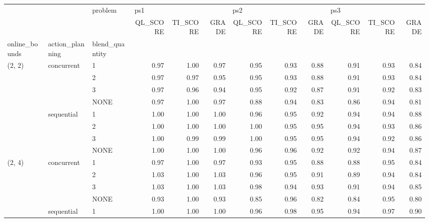 \begin{tabular}{lllrrrrrrrrr}
\toprule
       &            & problem & \multicolumn{3}{l}{ps1} & \multicolumn{3}{l}{ps2} & \multicolumn{3}{l}{ps3} \\
       &            & {} & QL\_SCORE & TI\_SCORE & GRADE & QL\_SCORE & TI\_SCORE & GRADE & QL\_SCORE & TI\_SCORE & GRADE \\
online\_bounds & action\_planning & blend\_quantity &          &          &       &          &          &       &          &          &       \\
\midrule
(2, 2) & concurrent & 1 &     0.97 &     1.00 &  0.97 &     0.95 &     0.93 &  0.88 &     0.91 &     0.93 &  0.84 \\
       &            & 2 &     0.97 &     0.97 &  0.95 &     0.95 &     0.93 &  0.88 &     0.91 &     0.93 &  0.84 \\
       &            & 3 &     0.97 &     0.96 &  0.94 &     0.95 &     0.92 &  0.87 &     0.91 &     0.92 &  0.83 \\
       &            & NONE &     0.97 &     1.00 &  0.97 &     0.88 &     0.94 &  0.83 &     0.86 &     0.94 &  0.81 \\
       & sequential & 1 &     1.00 &     1.00 &  1.00 &     0.96 &     0.95 &  0.92 &     0.94 &     0.94 &  0.88 \\
       &            & 2 &     1.00 &     1.00 &  1.00 &     1.00 &     0.95 &  0.95 &     0.94 &     0.93 &  0.86 \\
       &            & 3 &     1.00 &     0.99 &  0.99 &     1.00 &     0.95 &  0.95 &     0.94 &     0.92 &  0.86 \\
       &            & NONE &     1.00 &     1.00 &  1.00 &     0.96 &     0.96 &  0.92 &     0.92 &     0.94 &  0.87 \\
(2, 4) & concurrent & 1 &     0.97 &     1.00 &  0.97 &     0.93 &     0.95 &  0.88 &     0.88 &     0.95 &  0.84 \\
       &            & 2 &     1.03 &     1.00 &  1.03 &     0.96 &     0.95 &  0.91 &     0.89 &     0.94 &  0.84 \\
       &            & 3 &     1.03 &     1.00 &  1.03 &     0.98 &     0.94 &  0.93 &     0.91 &     0.94 &  0.85 \\
       &            & NONE &     0.93 &     1.00 &  0.93 &     0.85 &     0.96 &  0.82 &     0.84 &     0.95 &  0.80 \\
       & sequential & 1 &     1.00 &     1.00 &  1.00 &     0.96 &     0.98 &  0.95 &     0.94 &     0.97 &  0.90 \\

\end{tabular}
